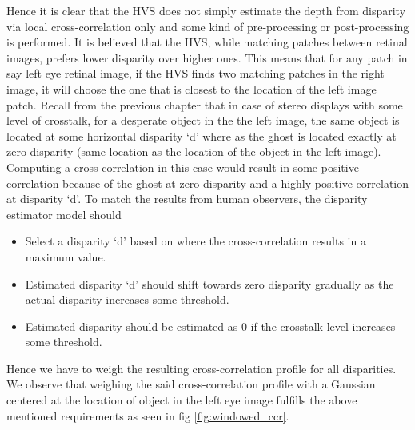 Hence it is clear that the HVS does not simply estimate the depth from disparity via local cross-correlation only and some kind of pre-processing or post-processing is performed. It is believed that the HVS, while matching patches between retinal images, prefers lower disparity over higher ones. This means that for any patch in say left eye retinal image, if the HVS finds two matching patches in the right image, it will choose the one that is closest to the location of the left image patch. Recall from the previous chapter that in case of stereo displays with some level of crosstalk, for a desperate object in the the left image, the same object is located at some horizontal disparity `d' where as the ghost is located exactly at zero disparity (same location as the location of the object in the left image). Computing a cross-correlation in this case would result in some positive correlation because of the ghost at zero disparity and a highly positive correlation at disparity `d'. To match the results from human observers, the disparity estimator model should
\begin{itemize}
\item{Select a disparity `d' based on where the cross-correlation results in a maximum value.}
\item{Estimated disparity `d' should shift towards zero disparity gradually as the actual disparity increases some threshold.}
\item{Estimated disparity should be estimated as 0 if the crosstalk level increases some threshold.}
\end{itemize}
Hence we have to weigh the resulting cross-correlation profile for all disparities. We observe that weighing the said cross-correlation profile with a Gaussian centered at the location of object in the left eye image fulfills the above mentioned requirements as seen in fig \ref{fig:windowed_ccr}.
